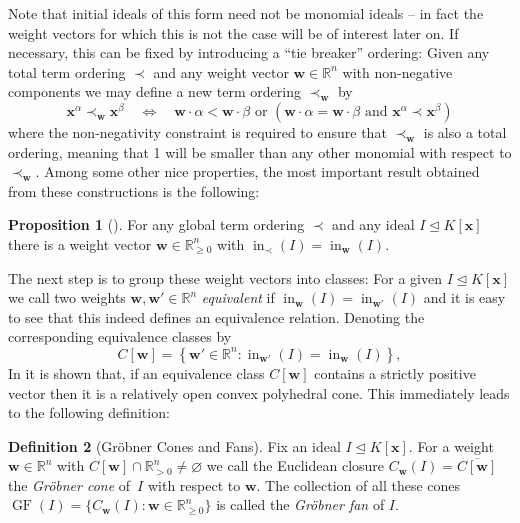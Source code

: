 \documentclass[
  paper=a4,
  titlepage,
  bibliography=totoc,
  listof=totoc,
  pagesize=pdftex
]{scrartcl}
\numberwithin{figure}{section}
\numberwithin{equation}{section}
\numberwithin{table}{section}
\newcommand*\setR{\mathds{R}}
\let\vec\mathbf
\let\idealof\trianglelefteq
\DeclareMathOperator{\initial}{in}
\DeclareMathOperator{\GF}{GF}
\theoremstyle{definition}
\newtheorem{definition}{Definition}
\newtheorem{proposition}[definition]{Proposition}
\numberwithin{definition}{section}
\begin{document}
Note that initial ideals of this form need not be monomial ideals -- in fact the weight
vectors for which this is not the case will be of interest later on. If necessary, this
can be fixed by introducing a \enquote{tie breaker} ordering: Given any total term
ordering $\prec$ and any weight vector $\vec w\in\setR^n$ with non-negative components we
may define a new term ordering $\prec_{\vec w}$ by
\[
  \vec x^\alpha \prec_{\vec w} \vec x^\beta
  \quad\iff\quad
  \vec w \cdot \alpha < \vec w\cdot \beta
  \text{ or }
  \left(
    \vec w \cdot \alpha = \vec w\cdot \beta
    \text{ and }
    \vec x^\alpha \prec \vec x^\beta
  \right)
\]
where the non-negativity constraint is required to ensure that $\prec_{\vec w}$ is also a
total ordering, meaning that 1 will be smaller than any other monomial with respect to
$\prec_{\vec w}$. Among some other nice properties, the most important result obtained
from these constructions is the following:

\begin{proposition}[{\cite[Proposition~1.11]{SturmGBCP}}]
  \label{prp:init}
  For any global term ordering $\prec$ and any ideal $I \idealof K[\vec x]$ there is a
  weight vector $\vec w \in \setR^n_{\geq0}$ with $\initial_\prec(I) = \initial_{\vec
  w}(I)$.
\end{proposition}

The next step is to group these weight vectors into classes: For a given $I \idealof
K[\vec x]$ we call two weights $\vec w, \vec w' \in \setR^n$ \emph{equivalent} if
$\initial_{\vec w}(I) = \initial_{\vec w'}(I)$ and it is easy to see that this indeed
defines an equivalence relation. Denoting the corresponding equivalence classes by
\[
  C[\vec w] = \left\{
    \vec w' \in \setR^n : \initial_{\vec w'}(I) = \initial_{\vec w}(I)
  \right\},
\]
In \cite[Section~2]{compGrobFan} it is shown that, if an equivalence class $C[\vec w]$
contains a strictly positive vector then it is a relatively open convex polyhedral cone.
This immediately leads to the following definition:

\begin{definition}[Gröbner Cones and Fans]
  \label{def:groebnerConeFan}
  Fix an ideal $I \idealof K[\vec x]$. For a weight $\vec w \in \setR^n$ with $C[\vec w]
  \cap \setR^n_{>0} \neq \varnothing$ we call the Euclidean closure $C_{\vec w}(I) =
  \overline{C[\vec w]}$ the \emph{Gröbner cone} of~$I$ with respect to $\vec w$. The
  collection of all these cones $\GF(I) = \{ C_{\vec w}(I) : \vec w \in \setR^n_{\geq0}
  \}$ is called the \emph{Gröbner fan} of $I$.
\end{definition}
\end{document}
